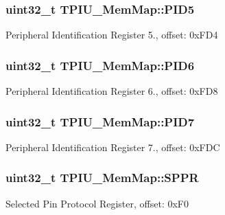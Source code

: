 \subsubsection[{P\+I\+D5}]{\setlength{\rightskip}{0pt plus 5cm}uint32\+\_\+t T\+P\+I\+U\+\_\+\+Mem\+Map\+::\+P\+I\+D5}\label{struct_t_p_i_u___mem_map_a538891793ff7ccfae685d49a0603dc77}
Peripheral Identification Register 5., offset\+: 0x\+F\+D4 \hypertarget{struct_t_p_i_u___mem_map_a185d2c4d405ba5af792d84b79491b64c}{}
\subsubsection[{P\+I\+D6}]{\setlength{\rightskip}{0pt plus 5cm}uint32\+\_\+t T\+P\+I\+U\+\_\+\+Mem\+Map\+::\+P\+I\+D6}\label{struct_t_p_i_u___mem_map_a185d2c4d405ba5af792d84b79491b64c}
Peripheral Identification Register 6., offset\+: 0x\+F\+D8 \hypertarget{struct_t_p_i_u___mem_map_a1b71c0dea2679488ce2ba937ed68597a}{}
\subsubsection[{P\+I\+D7}]{\setlength{\rightskip}{0pt plus 5cm}uint32\+\_\+t T\+P\+I\+U\+\_\+\+Mem\+Map\+::\+P\+I\+D7}\label{struct_t_p_i_u___mem_map_a1b71c0dea2679488ce2ba937ed68597a}
Peripheral Identification Register 7., offset\+: 0x\+F\+D\+C \hypertarget{struct_t_p_i_u___mem_map_a1b821d4f74563499ff569877ae672742}{}
\subsubsection[{S\+P\+P\+R}]{\setlength{\rightskip}{0pt plus 5cm}uint32\+\_\+t T\+P\+I\+U\+\_\+\+Mem\+Map\+::\+S\+P\+P\+R}\label{struct_t_p_i_u___mem_map_a1b821d4f74563499ff569877ae672742}
Selected Pin Protocol Register, offset\+: 0x\+F0 \hypertarget{struct_t_p_i_u___mem_map_a3570cf26e2ddc1d5700776743b0506e3}{}

